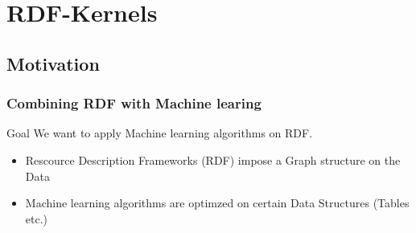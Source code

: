 \section{RDF-Kernels}
\subsection{Motivation}
\begin{frame}[fragile,t]
\frametitle{Combining RDF with Machine learing}
\begin{block}{Goal}
We want to apply Machine learning algorithms on RDF.
\end{block}
\pause
\begin{comment}
\begin{center}

\begin{tikzpicture}
  \draw[thick,rounded corners=1pt] (1,2.5) -- (3,3);
  \draw[thick,rounded corners=1pt] (1,1) -- (3,3);
  \draw[thick,rounded corners=1pt] (3,1) -- (3,3);
  \draw[thick,rounded corners=1pt] (3,1) -- (1,1);
  \draw[thick,rounded corners=1pt] (1,2.5) -- (0,1.5);
  \draw[thick,rounded corners=1pt] (1,2.5) -- (3,3);
  \draw[thick,rounded corners=1pt] (1,1) -- (0,1.5);
  \draw[fill=gray] (1,2.5) circle (0.25cm);
  \draw[fill=gray] (3,3) circle (0.25cm);
  \draw[fill=gray] (1,1) circle (0.25cm);
  \draw[fill=gray] (3,1) circle (0.25cm);
  \draw[fill=gray] (0,1.5) circle (0.25cm);
  \end{tikzpicture}

\end{center}
\end{comment}
\begin{itemize}
\item Rescource Description Frameworks (RDF) impose a Graph structure on the Data \pause
\item Machine learning algorithms are optimzed on certain Data Structures (Tables etc.)
\end{itemize}

\end{frame}
